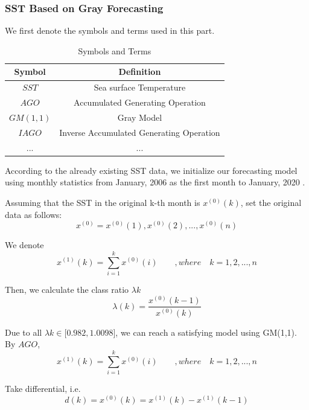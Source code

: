 \documentclass{mcmthesis}
\begin{document}
\subsubsection{SST Based on Gray Forecasting}\label{S4ss1}
	We first denote the symbols and terms used in this part.
\begin{table}[H]\small
    \centering
    \caption{Symbols and Terms}
    \label{symbol}
    \begin{tabular}{c c}
\toprule[2pt]
        Symbol & Definition\\
\hline
    $SST$ & Sea surface Temperature \\
    $AGO$ & Accumulated Generating Operation\\
    $GM(1,1)$ & Gray Model\\
    $IAGO$ & Inverse Accumulated Generating Operation\\
    $...$ & ...\\
\bottomrule[2pt]
    \end{tabular}
\end{table}
	According to the already existing SST data\cite{sstdata}, we initialize our forecasting model using monthly statistics from January, 2006 as the first month to January, 2020 .\par
	Assuming that the SST in the original k-th month is $x^{(0)}(k)$, set the original data as follows:
\begin{equation*}
	x^{(0)} = x^{(0)}(1), x^{(0)}(2), ..., x^{(0)}(n)
\end{equation*}\par
	We denote
\begin{equation*}
	x^{(1)}(k) =  \sum_{i=1}^kx^{(0)}(i) \qquad  ,where\quad k = 1, 2, ..., n
\end{equation*}\par
	Then, we calculate the class ratio $\lambda{k}$
\begin{equation*}
	\lambda(k) =  \frac{x^{(0)}(k-1)}{x^{(0)}(k)}
\end{equation*}\par
	Due to all $\lambda k \in \big[0.982, 1.0098\big]$, we can reach a satisfying model using GM(1,1).
	By $AGO$, 
\begin{equation*}
	x^{(1)}(k) =  \sum_{i=1}^kx^{(0)}(i) \qquad  ,where\quad k = 1, 2, ..., n
\end{equation*}\par
	Take differential, i.e.
\begin{equation*}
	d(k) = x^{(0)}(k) = x^{(1)}(k) - x^{(1)}(k-1)
\end{equation*}\par
\end{document}
